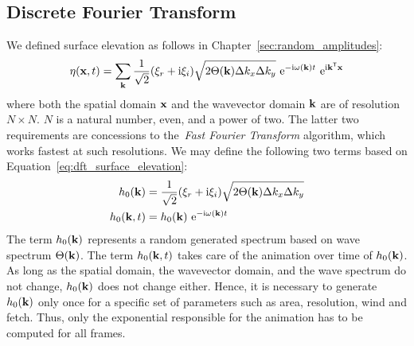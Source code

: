 \subsection{Discrete Fourier Transform}
We defined surface elevation as follows in Chapter~\ref{sec:random_amplitudes}:
\begin{equation}
\label{eq:dft_surface_elevation}
\eta(\mathbf{x}, t) = 
\sum_{\mathbf{k}}\frac{1}{\sqrt{2}}(\xi_r+\mathrm{i}\xi_i)
\sqrt{2\Theta(\mathbf{k})\Delta k_x \Delta k_y} 
~\mathrm{e}^{-\mathrm{i}\omega(\mathbf{k})t}
~\mathrm{e}^{\mathrm{i}\mathbf{k}^{\mathsf{T}}\mathbf{x}}
\end{equation}
where both the spatial domain $\mathbf{x}$ and the wavevector domain $\mathbf{k}$ are
of resolution $N \times N$. $N$ is a natural number, even, and a power of two.
The latter two requirements are concessions to the~\emph{Fast Fourier Transform}
algorithm, which works fastest at such resolutions. We may define the following
two terms based on Equation~\ref{eq:dft_surface_elevation}:
\begin{align}
\label{eq:dft_h0_k}
h_0(\mathbf{k})   &= \frac{1}{\sqrt{2}}(\xi_r+\mathrm{i}\xi_i)\sqrt{2\Theta(\mathbf{k})\Delta k_x \Delta k_y} \\
\label{eq:dft_h0_k_t}
h_0(\mathbf{k},t) &= h_0(\mathbf{k})~\mathrm{e}^{-\mathrm{i}\omega(\mathbf{k})t}
\end{align}
The term $h_0(\mathbf{k})$ represents a random generated spectrum based on wave
spectrum $\Theta(\mathbf{k})$. The term $h_0(\mathbf{k},t)$ takes care of the
animation over time of $h_0(\mathbf{k})$. As long as the spatial domain,
the wavevector domain, and the wave spectrum do not change, $h_0(\mathbf{k})$
does not change either. Hence, it is necessary to generate $h_0(\mathbf{k})$ only once
for a specific set of parameters such as area, resolution, wind and fetch. Thus,
only the exponential responsible for the animation has to be computed for all
frames.
%
